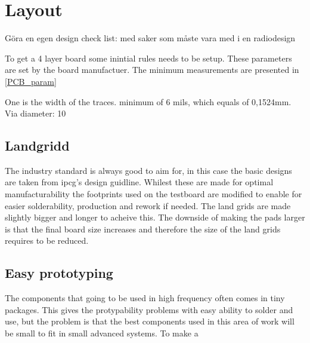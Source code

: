 \section{Layout}
Göra en egen design check list: med saker som måste vara med i en radiodesign 

To get a 4 layer board some inintial rules needs to be setup. These parameters are set by the board manufactuer. The minimum measurements are presented in \autoref{PCB_param}

One is the width of the traces. minimum of 6 mils, which equals of 0,1524mm. 
Via diameter: 10
 
\subsection{Landgridd}
The industry standard is always good to aim for, in this case the basic designs are taken from \gls{ipcg}'s design guidline\cite{ipcg}. Whilest these are made for optimal manufacturability the footprints used on the testboard are modified to enable for easier solderability, production and rework if needed. The land grids are made slightly bigger and longer to acheive this. The downside of making the pads larger is that the final board size increases and therefore the size of the land grids requires to be reduced.

\subsection{Easy prototyping}
The components that going to be used in high frequency often comes in tiny packages. This gives the protypability problems with easy ability to solder and use, but the problem is that the best components used in this area of work will be small to fit in small advanced systems. To make a